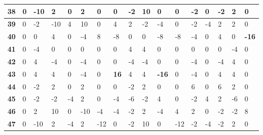 \begin{longtable}[c]{|l|l|l|l|l|l|l|l|l|l|l|l|l|l|l|l|l|}
\textbf{38} & 0          & -10        & 2          & 0          & 2          & 0          & 0          & -2         & 10         & 0          & 0           & -2          & 0           & -2          & 2           & 0           \\ \hline
\textbf{39} & 0          & -2         & -10        & 4          & 10         & 0          & 4          & 2          & -2         & -4         & 0           & -2          & -4          & 2           & 2           & 0           \\ \hline
\textbf{40} & 0          & 0          & 4          & 0          & -4         & 8          & -8         & 0          & 0          & -8         & -8          & -4          & 0           & 4           & 0           & \textbf{-16}         \\ \hline
\textbf{41} & 0          & -4         & 0          & 0          & 0          & 0          & 0          & 4          & 4          & 0          & 0           & 0           & 0           & 0           & -4          & 0           \\ \hline
\textbf{42} & 0          & 4          & -4         & 0          & -4         & 0          & 0          & -4         & -4         & 0          & 0           & -4          & 0           & -4          & 4           & 0           \\ \hline
\textbf{43} & 0          & 4          & 4          & 0          & -4         & 0          & \textbf{16}         & 4          & 4          & \textbf{-16}        & 0           & -4          & 0           & 4           & 4           & 0           \\ \hline
\textbf{44} & 0          & -2         & 2          & 0          & 2          & 0          & 0          & -2         & 2          & 0          & 0           & 6           & 0           & 6           & 2           & 0           \\ \hline
\textbf{45} & 0          & -2         & -2         & -4         & 2          & 0          & -4         & -6         & -2         & 4          & 0           & -2          & 4           & 2           & -6          & 0           \\ \hline
\textbf{46} & 0          & 2          & 10         & 0          & -10        & -4         & -4         & -2         & 2          & -4         & 4           & 2           & 0           & -2          & -2          & 8           \\ \hline
\textbf{47} & 0          & -10        & 2          & -4         & 2          & -12        & 0          & -2         & 10         & 0          & -12         & -2          & -4          & -2          & 2           & 0           \\ \hline

\end{longtable}
